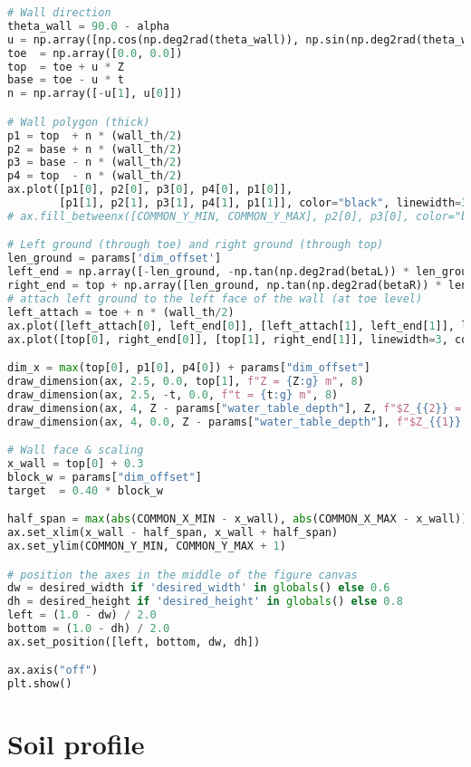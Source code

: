 \begin{lstlisting}[language=Python]
# Wall direction
theta_wall = 90.0 - alpha
u = np.array([np.cos(np.deg2rad(theta_wall)), np.sin(np.deg2rad(theta_wall))])
toe  = np.array([0.0, 0.0])
top  = toe + u * Z
base = toe - u * t
n = np.array([-u[1], u[0]])

# Wall polygon (thick)
p1 = top  + n * (wall_th/2)
p2 = base + n * (wall_th/2)
p3 = base - n * (wall_th/2)
p4 = top  - n * (wall_th/2)
ax.plot([p1[0], p2[0], p3[0], p4[0], p1[0]],
        [p1[1], p2[1], p3[1], p4[1], p1[1]], color="black", linewidth=3)
# ax.fill_betweenx([COMMON_Y_MIN, COMMON_Y_MAX], p2[0], p3[0], color="black", zorder=0)

# Left ground (through toe) and right ground (through top)
len_ground = params['dim_offset']
left_end = np.array([-len_ground, -np.tan(np.deg2rad(betaL)) * len_ground])
right_end = top + np.array([len_ground, np.tan(np.deg2rad(betaR)) * len_ground])
# attach left ground to the left face of the wall (at toe level)
left_attach = toe + n * (wall_th/2)
ax.plot([left_attach[0], left_end[0]], [left_attach[1], left_end[1]], linewidth=3, color="black")
ax.plot([top[0], right_end[0]], [top[1], right_end[1]], linewidth=3, color="black")

dim_x = max(top[0], p1[0], p4[0]) + params["dim_offset"]
draw_dimension(ax, 2.5, 0.0, top[1], f"Z = {Z:g} m", 8)
draw_dimension(ax, 2.5, -t, 0.0, f"t = {t:g} m", 8)
draw_dimension(ax, 4, Z - params["water_table_depth"], Z, f"$Z_{{2}} = {params['water_table_depth']:g}$ m", 8)
draw_dimension(ax, 4, 0.0, Z - params["water_table_depth"], f"$Z_{{1}} = {Z - params['water_table_depth']:g}$ m", 8)

# Wall face & scaling
x_wall = top[0] + 0.3
block_w = params["dim_offset"]
target  = 0.40 * block_w

half_span = max(abs(COMMON_X_MIN - x_wall), abs(COMMON_X_MAX - x_wall))
ax.set_xlim(x_wall - half_span, x_wall + half_span)
ax.set_ylim(COMMON_Y_MIN, COMMON_Y_MAX + 1)

# position the axes in the middle of the figure canvas
dw = desired_width if 'desired_width' in globals() else 0.6
dh = desired_height if 'desired_height' in globals() else 0.8
left = (1.0 - dw) / 2.0
bottom = (1.0 - dh) / 2.0
ax.set_position([left, bottom, dw, dh])

ax.axis("off")
plt.show()
\end{lstlisting}

\section{Soil profile}

